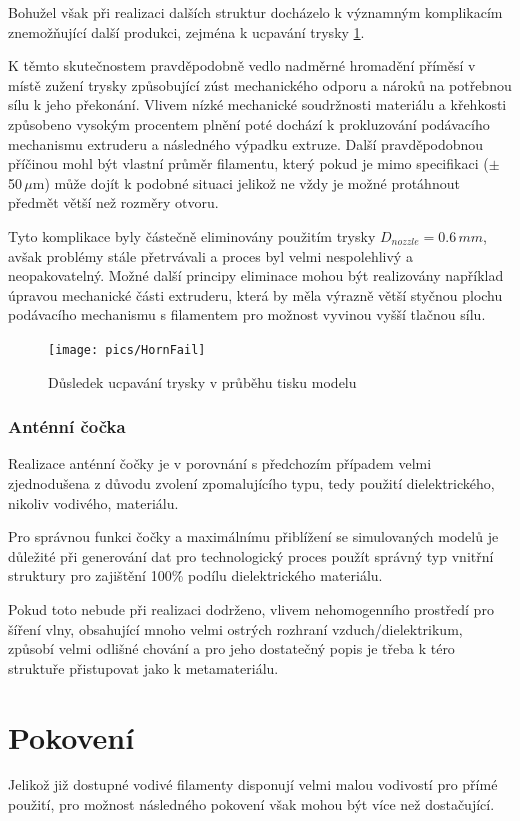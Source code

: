 Bohužel však při realizaci dalších struktur docházelo k významným komplikacím znemožňující další produkci, zejména k ucpavání trysky \ref{fig:HornFail}.

K těmto skutečnostem pravděpodobně vedlo nadměrné hromadění příměsí v místě zužení trysky způsobující zúst mechanického odporu a nároků na potřebnou sílu k jeho překonání. Vlivem nízké mechanické soudržnosti materiálu a křehkosti způsobeno vysokým procentem plnění poté dochází k prokluzování podávacího mechanismu extruderu a následného výpadku extruze. Další pravděpodobnou příčinou mohl být vlastní průměr filamentu, který pokud je mimo specifikaci ($\pm$50\,$\mu$m) může dojít k podobné situaci jelikož ne vždy je možné protáhnout předmět větší než rozměry otvoru. 

Tyto komplikace byly částečně eliminovány použitím trysky $D_{nozzle} = 0.6\,mm$, avšak problémy stále přetrvávali a proces byl velmi nespolehlivý a neopakovatelný. Možné další principy eliminace mohou být realizovány například úpravou mechanické části extruderu, která by měla výrazně větší styčnou plochu podávacího mechanismu s filamentem pro možnost vyvinou vyšší tlačnou sílu.

\begin{figure}[h]
\begin{center}
\texttt{[image: pics/HornFail]}
\caption{Důsledek ucpavání trysky v průběhu tisku modelu}
\label{fig:HornFail}
\end{center}
\end{figure}


\subsubsection{Anténní čočka}
Realizace anténní čočky je v porovnání s předchozím případem velmi zjednodušena z důvodu zvolení zpomalujícího typu, tedy použití dielektrického, nikoliv vodivého, materiálu.

Pro správnou funkci čočky a maximálnímu přiblížení se simulovaných modelů je důležité při generování dat pro technologický proces použít správný typ vnitřní struktury pro zajištění 100\.\% podílu dielektrického materiálu.

Pokud toto nebude při realizaci dodrženo, vlivem nehomogenního prostředí pro šíření vlny, obsahující mnoho velmi ostrých rozhraní vzduch/dielektrikum, způsobí velmi odlišné chování a pro jeho dostatečný popis je třeba k téro struktuře přistupovat jako k metamateriálu.


\section{Pokovení}
Jelikož již dostupné vodivé filamenty disponují velmi malou vodivostí pro přímé použití, pro možnost následného pokovení však mohou být více než dostačující.


